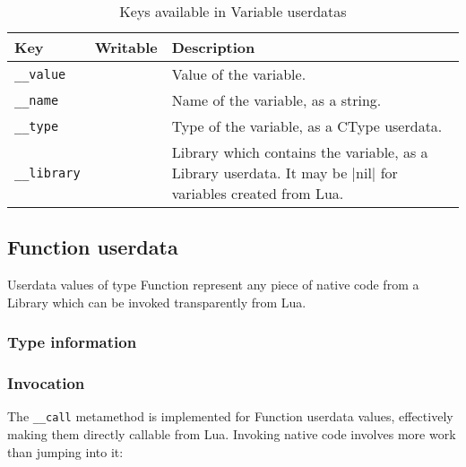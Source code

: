 \begin{table}[ht]
	\centering
	\begin{tabular}{lcp{}}
		\toprule
		Key & Writable & Description \\
		\midrule
		\texttt{\_\_value} & \Tick & Value of the variable. \\
		\texttt{\_\_name} & & Name of the variable, as a string. \\
		\texttt{\_\_type} & & Type of the variable, as a \textsf{CType} userdata. \\
		\texttt{\_\_library} & & Library which contains the variable, as
			a \textsf{Library} userdata. It may be \Mlua|nil| for variables created from Lua. \\
		\bottomrule
	\end{tabular}
	\caption{Keys available in \textsf{Variable} userdatas}
	\label{tab:eol-api-variable-keys}
\end{table}


\subsection{Function userdata}
	\label{sec:eol-api-function-t}

Userdata values of type \textsf{Function} represent any piece of native code
from a \textsf{Library} which can be invoked transparently from Lua.

\subsubsection{Type information}


\subsubsection{Invocation}

The \texttt{\_\_call} metamethod is implemented for \textsf{Function}
userdata values, effectively making them directly callable from Lua. Invoking
native code involves more work than jumping into it:

